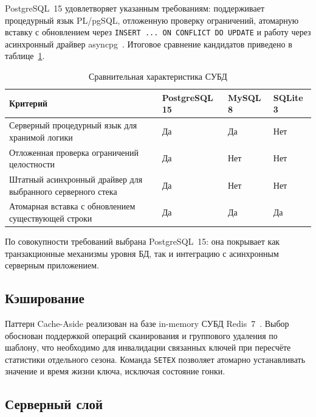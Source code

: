 PostgreSQL~15 удовлетворяет указанным требованиям: поддерживает процедурный
язык PL/pgSQL, отложенную проверку ограничений, атомарную вставку
с обновлением через \texttt{INSERT ... ON CONFLICT DO UPDATE} и работу через
асинхронный драйвер asyncpg~\cite{postgres,asyncpg}. Итоговое сравнение
кандидатов приведено в таблице~\ref{tab:dbms-compare}.

\begin{table}[H]
\caption{Сравнительная характеристика СУБД}
\label{tab:dbms-compare}
\centering
\small
\renewcommand{\arraystretch}{1.2}
\setlength{\tabcolsep}{5pt}
\begin{tabular}{|>{\RaggedRight\arraybackslash}p{}
  |>{\centering\arraybackslash}p{}
  |>{\centering\arraybackslash}p{}
  |>{\centering\arraybackslash}p{}|}
\hline
\textbf{Критерий} & \textbf{PostgreSQL 15} & \textbf{MySQL 8} & \textbf{SQLite 3} \\
\hline
Серверный процедурный язык для хранимой логики & Да & Да & Нет \\
\hline
Отложенная проверка ограничений целостности & Да & Нет & Нет \\
\hline
Штатный асинхронный драйвер для выбранного серверного стека & Да & Нет & Нет \\
\hline
Атомарная вставка с обновлением существующей строки & Да & Да & Да \\
\hline
\end{tabular}
\end{table}

По совокупности требований выбрана PostgreSQL~15: она покрывает как
транзакционные механизмы уровня БД, так и интеграцию с асинхронным
серверным приложением.

\subsection{Кэширование}

Паттерн Cache-Aside реализован на базе in-memory СУБД Redis~7~\cite{redis}.
Выбор обоснован поддержкой операций сканирования и группового удаления по
шаблону, что необходимо для инвалидации связанных ключей при пересчёте
статистики отдельного сезона. Команда \texttt{SETEX} позволяет атомарно
устанавливать значение и время жизни ключа, исключая состояние гонки.

\subsection{Серверный слой}

